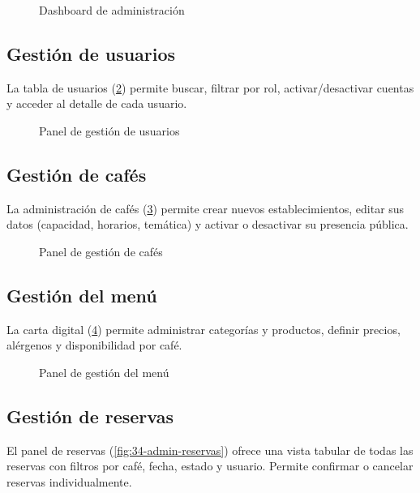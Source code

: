 \documentclass[12pt,a4paper,twoside,openright]{report}
\begin{document}
\begin{figure}[H]
  \centering
  \fbox{\rule{0pt}{6cm}\rule{12cm}{0pt}}
  \caption{Dashboard de administración}
  \label{fig:30-admin-dashboard}
\end{figure}

\subsection{Gestión de usuarios}
La tabla de usuarios (\cref{fig:31-admin-usuarios}) permite buscar, filtrar por
rol, activar/desactivar cuentas y acceder al detalle de cada usuario.

\begin{figure}[H]
  \centering
  \fbox{\rule{0pt}{6cm}\rule{12cm}{0pt}}
  \caption{Panel de gestión de usuarios}
  \label{fig:31-admin-usuarios}
\end{figure}

\subsection{Gestión de cafés}
La administración de cafés (\cref{fig:32-admin-cafes}) permite crear nuevos
establecimientos, editar sus datos (capacidad, horarios, temática) y activar o
desactivar su presencia pública.

\begin{figure}[H]
  \centering
  \fbox{\rule{0pt}{6cm}\rule{12cm}{0pt}}
  \caption{Panel de gestión de cafés}
  \label{fig:32-admin-cafes}
\end{figure}

\subsection{Gestión del menú}
La carta digital (\cref{fig:33-admin-menu}) permite administrar categorías y
productos, definir precios, alérgenos y disponibilidad por café.

\begin{figure}[H]
  \centering
  \fbox{\rule{0pt}{6cm}\rule{12cm}{0pt}}
  \caption{Panel de gestión del menú}
  \label{fig:33-admin-menu}
\end{figure}

\subsection{Gestión de reservas}
El panel de reservas (\cref{fig:34-admin-reservas}) ofrece una vista tabular de
todas las reservas con filtros por café, fecha, estado y usuario. Permite confirmar
o cancelar reservas individualmente.
\end{document}
